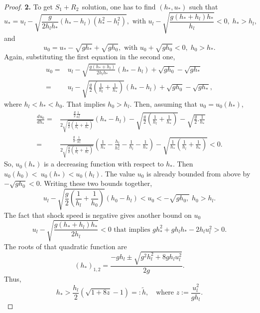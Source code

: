 \documentclass{article}
\theoremstyle{plain}
\theoremstyle{definition}
\theoremstyle{remark}
\begin{document}
\begin{proof}
\noindent \textbf{2.}
To get \(S_{1} + R_{2}\ \ \)solution, one has to find
\((h_{\ast},u_{\ast})\) such that
\[ 
u_{\ast} = u_{l} - \sqrt{\frac{g}{2h_{l}h_{\ast}}\left( h_{\ast} - h_{l} \right)
\left( h_{\ast}^{2} - h_{l}^{2} \right)}, \text{ with }
u_{l} - \sqrt{\frac{g\left( h_{\ast} + h_{l} \right)h_{\ast}}{h_{l}}}<0, \; 
h_{\ast} > h_{l},
\]
and 
\[
u_{0} = u_{\ast} - \sqrt{gh_{\ast}} + \sqrt{gh_{0}}, \text{ with } 
u_{0} + \sqrt{gh_{0}} < 0, \; h_{0} > h_{\ast}.
\]
Again, substituting the first equation in the second one,
\[
\begin{split}
u_{0} = & u_{l} - \sqrt{\frac{g\left( h_{\ast} + h_{l} \right)}{{2h}_{l}h_{\ast}}}\left( h_{\ast} 
- h_{l} \right) + \sqrt{gh_{0}} - \sqrt{gh_{\ast}}\\
= & u_{l} - \sqrt{\frac{g}{2}\left( \frac{1}{h_{l}} + \frac{1}{h_{\ast}} \right)}\left( h_{\ast} 
- h_{l} \right) + \sqrt{gh_{0}} - \sqrt{gh_{\ast}},
\end{split}
\]
where \(h_{l} < h_{\ast} <  h_{0} \). That implies \(h_{0} > h_{l}\). Then, 
assuming that $u_{0}=u_{0}(h_{\ast})$, 
\[
\begin{split}
\frac{{du}_{0}}{{dh}_{\ast}} = & \frac{\frac{g}{2} \frac{1}{h_{\ast}^{2}}}{2\sqrt{\frac{g}{2}
\left( \frac{1}{h_{l}} + \frac{1}{h_{\ast}} \right)}}\left( h_{\ast} - h_{l} \right) 
- \sqrt{\frac{g}{2}\left( \frac{1}{h_{l}} + \frac{1}{h_{\ast}} \right)} 
- \sqrt{\frac{g}{2}.\frac{1}{h_{\ast}}} \\ 
= & \frac{\frac{g}{2}.\frac{1}{h_{\ast}^{2}}}{2\sqrt{\frac{g}{2}
\left( \frac{1}{h_{l}} + \frac{1}{h_{\ast}} \right)}}\left( \frac{1}{h_{\ast}} 
- \frac{h_{l}}{h_{\ast}^{2}} - \frac{1}{h_{l}} - \frac{1}{h_{\ast}} \right) 
- \sqrt{\frac{1}{h_{\ast}}\left( \frac{1}{h_{l}} + \frac{1}{h_{\ast}} \right)} < 0.
\end{split}
\]
So, \(u_{0}\left( h_{\ast} \right)\) is a decreasing function with respect to
\(h_{\ast}\). Then
\(u_{0}(h_{0}) < \ u_{0}(h_{\ast}) 
< u_{0}(h_{l}).\)
The value $u_{0}$ is already bounded from above by $-\sqrt{gh_{0}}<0$.
Writing these two bounds together,
\begin{equation*} 
u_{l} - \sqrt{\frac{g}{2}\left( \frac{1}{h_{l}} + \frac{1}{h_{0}} \right)}
\left( h_{0} - h_{l} \right) < u_{0} 
< -\sqrt{gh_{0},}\;  h_{0} > h_{l}.
\end{equation*}
The fact that shock speed is negative gives another bound on 
\({u}_{0}\)
\[
u_{l} - \sqrt{\frac{g\left( h_{\ast} + h_{l} \right)h_{\ast}}{2h_{l}}}<0 
\text{ that implies }  gh_{\ast}^{2} + gh_{l}h_{\ast} - 2h_{l}u_{l}^{2} > 0.
\]
The roots of that quadratic function are
\[
(h_{\ast})_{1,2} = \frac{- gh_{l} \pm \sqrt{g^{2}h_{l}^{2} + 8gh_{l}u_{l}^{2}}}{2g}.
\]
Thus, 
\[
h_{\ast} > \frac{h_l}{2}\left( \sqrt{1+8z} - 1\right) =: \tilde{h}, \quad \text{where } z:= \frac{u_l^2}{gh_l}.
\]


\end{proof}
\end{document}
